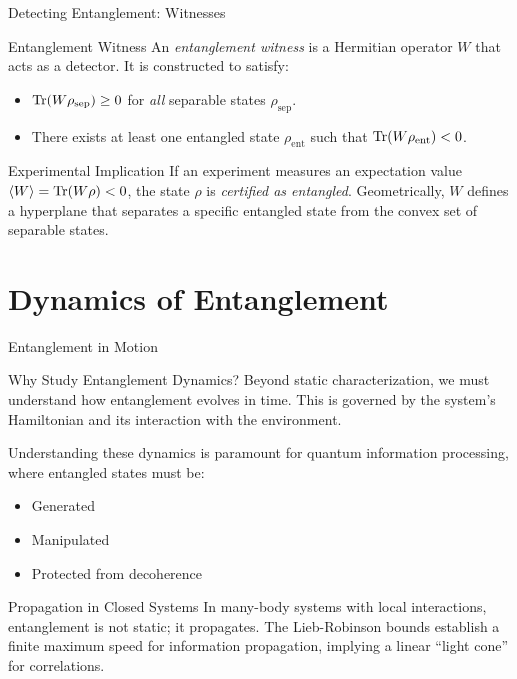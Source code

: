 \begin{frame}{Detecting Entanglement: Witnesses}
  \begin{block}{Entanglement Witness}
    An \emph{entanglement witness} is a Hermitian operator $W$ that acts as a
    detector. It is constructed to satisfy:
    \begin{itemize}
      \item $\mathrm{Tr}(W \rho_{\text{sep}}) \ge 0$ for \emph{all} separable states
        $\rho_{\text{sep}}$.
        \pause
      \item There exists at least one entangled state $\rho_{\text{ent}}$ such
        that $\mathrm{Tr}(W \rho_{\text{ent}}) < 0$.
    \end{itemize}
  \end{block}
  \pause
  \begin{alertblock}{Experimental Implication}
    If an experiment measures an expectation value $\braket{W} = \mathrm{Tr}(W \rho) <
    0$, the state $\rho$ is \emph{certified as entangled}.
    \vspace{1em}
    Geometrically, $W$ defines a hyperplane that separates a specific entangled
    state from the convex set of separable states.
  \end{alertblock}
\end{frame}


\section{Dynamics of Entanglement}


\begin{frame}{Entanglement in Motion}
  \begin{block}{Why Study Entanglement Dynamics?}
    Beyond static characterization, we must understand how entanglement evolves
    in time. This is governed by the system's Hamiltonian and its interaction
    with the environment.
    \pause

    Understanding these dynamics is paramount for quantum information
    processing, where entangled states must be:
    \begin{itemize}
      \item Generated
      \item Manipulated
      \item Protected from decoherence
    \end{itemize}
  \end{block}
  \pause
  \begin{alertblock}{Propagation in Closed Systems}
    In many-body systems with local interactions, entanglement is not static; it
    propagates. The \alert{Lieb-Robinson bounds} establish a finite maximum
    speed for information propagation, implying a linear ``light cone'' for
    correlations.
  \end{alertblock}
\end{frame}

